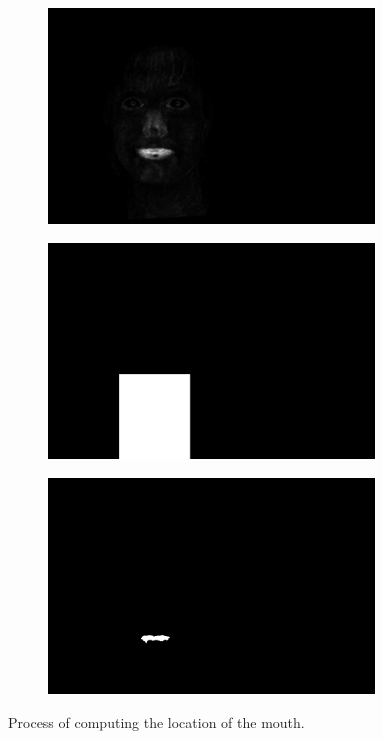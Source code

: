 \begin{figure}[H]
\centering

\begin{subfigure}{.33\textwidth}
  \centering
  \includegraphics[width=0.95\textwidth]{img/fd/MouthMask.png}
  \caption{}
\end{subfigure}%
\begin{subfigure}{.33\textwidth}
  \centering
  \includegraphics[width=0.95\textwidth]{img/fd/notNonMouthMask.png}
  \caption{}
\end{subfigure}%
\begin{subfigure}{.33\textwidth}
  \centering
  \includegraphics[width=0.95\textwidth]{img/fd/MouthBlob.png}
  \caption{}
\end{subfigure}%

\caption{Process of computing the location of the mouth.}
\label{fig:mouthMap}
\end{figure}